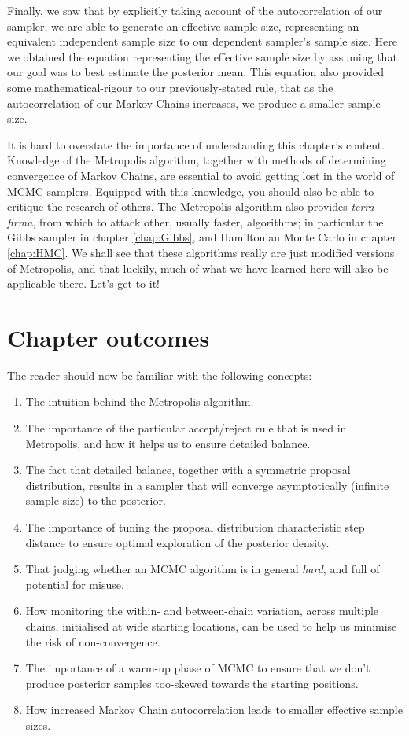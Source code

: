 \documentclass[11pt,fullpage]{book}
\begin{document}
Finally, we saw that by explicitly taking account of the autocorrelation of our sampler, we are able to generate an effective sample size, representing an equivalent independent sample size to our dependent sampler's sample size. Here we obtained the equation representing the effective sample size by assuming that our goal was to best estimate the posterior mean. This equation also provided some mathematical-rigour to our previously-stated rule, that as the autocorrelation of our Markov Chains increases, we produce a smaller sample size.

It is hard to overstate the importance of understanding this chapter's content. Knowledge of the Metropolis algorithm, together with methods of determining convergence of Markov Chains, are essential to avoid getting lost in the world of MCMC samplers. Equipped with this knowledge, you should also be able to critique the research of others. The Metropolis algorithm also provides \textit{terra firma}, from which to attack other, usually faster, algorithms; in particular the Gibbs sampler in chapter \ref{chap:Gibbs}, and Hamiltonian Monte Carlo in chapter \ref{chap:HMC}. We shall see that these algorithms really are just modified versions of Metropolis, and that luckily, much of what we have learned here will also be applicable there. Let's get to it!

\section{Chapter outcomes}
The reader should now be familiar with the following concepts:

\begin{enumerate}
\item The intuition behind the Metropolis algorithm.
\item The importance of the particular accept/reject rule that is used in Metropolis, and how it helps us to ensure detailed balance. 
\item The fact that detailed balance, together with a symmetric proposal distribution, results in a sampler that will converge asymptotically (infinite sample size) to the posterior.
\item The importance of tuning the proposal distribution characteristic step distance to ensure optimal exploration of the posterior density.
\item That judging whether an MCMC algorithm is in general \textit{hard}, and full of potential for misuse.
\item How monitoring the within- and between-chain variation, across multiple chains, initialised at wide starting locations, can be used to help us minimise the risk of non-convergence. 
\item The importance of a warm-up phase of MCMC to ensure that we don't produce posterior samples too-skewed towards the starting positions.
\item How increased Markov Chain autocorrelation leads to smaller effective sample sizes.
\end{enumerate}
\end{document}
